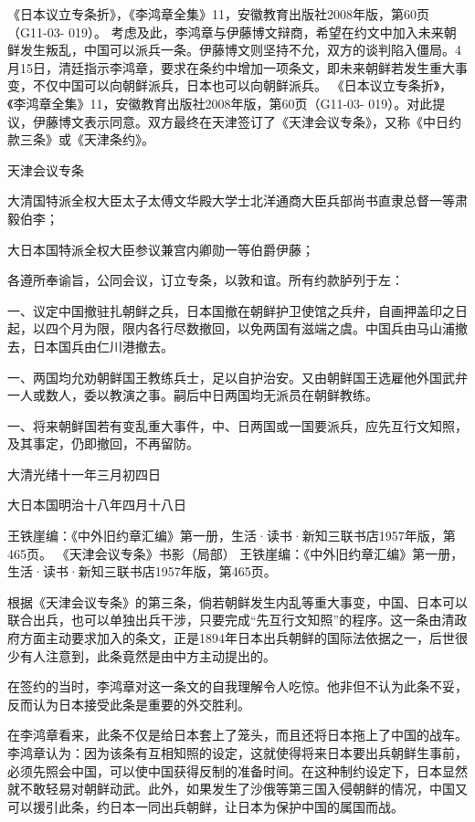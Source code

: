 \documentclass[12pt,UTF8]{ctexbook}
\begin{document}
《日本议立专条折》，《李鸿章全集》11，安徽教育出版社2008年版，第60页（G11-03- 019）。
考虑及此，李鸿章与伊藤博文辩商，希望在约文中加入未来朝鲜发生叛乱，中国可以派兵一条。伊藤博文则坚持不允，双方的谈判陷入僵局。4月15日，清廷指示李鸿章，要求在条约中增加一项条文，即未来朝鲜若发生重大事变，不仅中国可以向朝鲜派兵，日本也可以向朝鲜派兵。 《日本议立专条折》，《李鸿章全集》11，安徽教育出版社2008年版，第60页（G11-03- 019）。对此提议，伊藤博文表示同意。双方最终在天津签订了《天津会议专条》，又称《中日约款三条》或《天津条约》。

天津会议专条

大清国特派全权大臣太子太傅文华殿大学士北洋通商大臣兵部尚书直隶总督一等肃毅伯李；

大日本国特派全权大臣参议兼宫内卿勋一等伯爵伊藤；

各遵所奉谕旨，公同会议，订立专条，以敦和谊。所有约款胪列于左：

一、议定中国撤驻扎朝鲜之兵，日本国撤在朝鲜护卫使馆之兵弁，自画押盖印之日起，以四个月为限，限内各行尽数撤回，以免两国有滋端之虞。中国兵由马山浦撤去，日本国兵由仁川港撤去。

一、两国均允劝朝鲜国王教练兵士，足以自护治安。又由朝鲜国王选雇他外国武弁一人或数人，委以教演之事。嗣后中日两国均无派员在朝鲜教练。

一、将来朝鲜国若有变乱重大事件，中、日两国或一国要派兵，应先互行文知照，及其事定，仍即撤回，不再留防。

大清光绪十一年三月初四日

大日本国明治十八年四月十八日


王铁崖编：《中外旧约章汇编》第一册，生活·读书·新知三联书店1957年版，第465页。
《天津会议专条》书影（局部） 王铁崖编：《中外旧约章汇编》第一册，生活·读书·新知三联书店1957年版，第465页。

根据《天津会议专条》的第三条，倘若朝鲜发生内乱等重大事变，中国、日本可以联合出兵，也可以单独出兵干涉，只要完成“先互行文知照”的程序。这一条由清政府方面主动要求加入的条文，正是1894年日本出兵朝鲜的国际法依据之一，后世很少有人注意到，此条竟然是由中方主动提出的。

在签约的当时，李鸿章对这一条文的自我理解令人吃惊。他非但不认为此条不妥，反而认为日本接受此条是重要的外交胜利。

在李鸿章看来，此条不仅是给日本套上了笼头，而且还将日本拖上了中国的战车。李鸿章认为：因为该条有互相知照的设定，这就使得将来日本要出兵朝鲜生事前，必须先照会中国，可以使中国获得反制的准备时间。在这种制约设定下，日本显然就不敢轻易对朝鲜动武。此外，如果发生了沙俄等第三国入侵朝鲜的情况，中国又可以援引此条，约日本一同出兵朝鲜，让日本为保护中国的属国而战。
\end{document}
